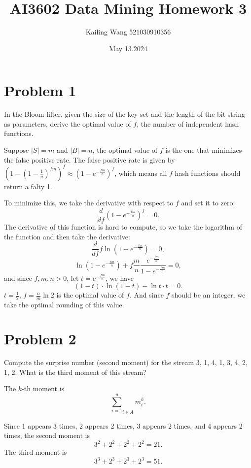 \documentclass{article}
\begin{document}
\title{AI3602 Data Mining Homework 3}
\author{Kailing Wang 521030910356}
\date{May 13.2024}
\maketitle

\section*{Problem 1}
\begin{tcolorbox}[colback=gray!10, breakable]
	In the Bloom filter, given the size of the key set and the length of the bit string as parameters, derive the optimal value of $f$, the number of independent hash functions.
\end{tcolorbox}
Suppose $|S|=m$ and $|B|=n$, the optimal value of $f$ is the one that minimizes the false positive rate. The false positive rate is given by $(1-(1-\frac{1}{n})^{fm})^f\approx(1-e^{-\frac{fm}{n}})^f$, which means all $f$ hash functions should return a falty 1.

To minimize this, we take the derivative with respect to $f$ and set it to zero:
\[
	\frac{d}{df} (1-e^{-\frac{fm}{n}})^f = 0.
\]
The derivative of this function is hard to compute, so we take the logarithm of the function and then take the derivative:
\[
	\frac{d}{df} f\ln(1-e^{-\frac{fm}{n}}) = 0,
\]
\[
	\ln(1-e^{-\frac{fm}{n}}) + f\frac{m}{n}\frac{e^{-\frac{fm}{n}}}{1-e^{-\frac{fm}{n}}} = 0,
\]
and since $f, m, n>0$, let $t=e^{-\frac{fm}{n}}$, we have
\[
	(1-t)\cdot\ln(1-t) - \ln t \cdot t = 0.
\]
$t=\frac{1}{2}$, $f=\frac{n}{m}\ln 2$ is the optimal value of $f$. And since $f$ should be an integer, we take the optimal rounding of this value.
\section*{Problem 2}
\begin{tcolorbox}[colback=gray!10, breakable]
	Compute the surprise number (second moment) for the stream 3, 1, 4, 1, 3, 4, 2, 1, 2. What is the third moment of this stream?
\end{tcolorbox}
The $k$-th moment is
\[
	{\sum_{i=1}^{n}}_{i\in A} m_i^k.
\]

Since 1 appears 3 times, 2 appears 2 times, 3 appears 2 times, and 4 appears 2 times, the second moment is
\[
	3^2 + 2^2 + 2^2 + 2^2 = 21.
\]
The third moment is
\[
	3^3 + 2^3 + 2^3 + 2^3 = 51.
\]
\end{document}
